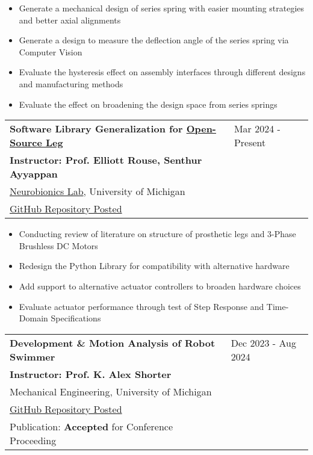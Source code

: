 \documentclass[letter,12pt]{article}
\begin{document}
    \begin{itemize}[
        rightmargin=2cm
    ]
        \setlength{\itemsep}{1pt}
        \setlength{\parskip}{0pt}
        \setlength{\parsep}{0pt}
        \item {Generate a mechanical design of series spring with easier mounting strategies and better axial alignments}
        \item {Generate a design to measure the deflection angle of the series spring via Computer Vision}
        \item {Evaluate the hysteresis effect on assembly interfaces through different designs and manufacturing methods}
        \item {Evaluate the effect on broadening the design space from series springs}
    \end{itemize}


\begin{tabularx}{\linewidth}{@{}l X@{}}
\large \textbf{Software Library Generalization for \href{https://www.opensourceleg.org/about}{Open-Source Leg}} & \hfill Mar 2024 - Present \\
\small{\textbf{Instructor: Prof. Elliott Rouse, Senthur Ayyappan}} & \hfill {} \\
\small{\href{https://neurobionics.robotics.umich.edu/}{Neurobionics Lab}, University of Michigan} & \hfill {} \\
\small{\href{https://github.com/neurobionics/opensourceleg}{GitHub Repository Posted}} & \hfill {} \\
\end{tabularx}

\begin{itemize}[
    rightmargin=2cm
]
    \setlength{\itemsep}{1pt}
    \setlength{\parskip}{0pt}
    \setlength{\parsep}{0pt}
    \item{\small Conducting review of literature on structure of prosthetic legs and 3-Phase Brushless DC Motors}
    \item{\small Redesign the Python Library for compatibility with alternative hardware}
    \item{\small Add support to alternative actuator controllers to broaden hardware choices}
    \item{\small Evaluate actuator performance through test of Step Response and Time-Domain Specifications}
\end{itemize}

\begin{tabularx}{\linewidth}{@{}l X@{}}
\large \textbf{Development \& Motion Analysis of Robot Swimmer} & \hfill Dec 2023 - Aug 2024 \\
\small{\textbf{Instructor: Prof. K. Alex Shorter}} & \hfill {} \\
\small{Mechanical Engineering, University of Michigan} & \hfill {} \\
\small{\href{https://github.com/Robin0265/PathPlanning_Code}{GitHub Repository Posted}} & \hfill {} \\
\small{Publication: \textbf{Accepted} for Conference Proceeding \cite{Swimmingbot}} & \hfill {} \\
\end{tabularx}
\end{document}
